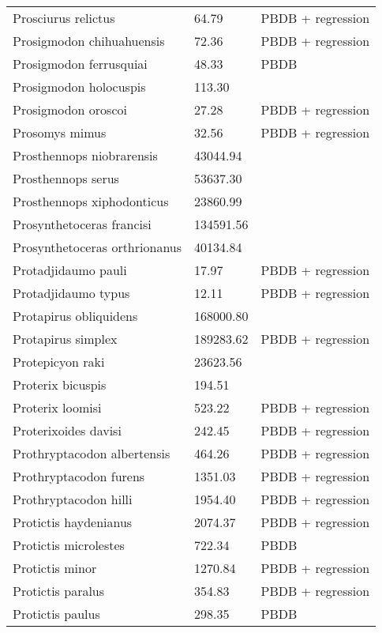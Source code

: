 \documentclass{article}
\begin{document}
\begin{center}
\begin{longtable}{p{} p{} p{}}
    Prosciurus relictus & 64.79 & PBDB + regression \\ 
    Prosigmodon chihuahuensis & 72.36 & PBDB + regression \\ 
    Prosigmodon ferrusquiai & 48.33 & PBDB \\ 
    Prosigmodon holocuspis & 113.30 & \cite{Tomiya2013} \\ 
    Prosigmodon oroscoi & 27.28 & PBDB + regression \\ 
    Prosomys mimus & 32.56 & PBDB + regression \\ 
    Prosthennops niobrarensis & 43044.94 & \cite{Tomiya2013} \\ 
    Prosthennops serus & 53637.30 & \cite{Tomiya2013} \\ 
    Prosthennops xiphodonticus & 23860.99 & \cite{Tomiya2013} \\ 
    Prosynthetoceras francisi & 134591.56 & \cite{Tomiya2013} \\ 
    Prosynthetoceras orthrionanus & 40134.84 & \cite{Tomiya2013} \\ 
    Protadjidaumo pauli & 17.97 & PBDB + regression \\ 
    Protadjidaumo typus & 12.11 & PBDB + regression \\ 
    Protapirus obliquidens & 168000.80 & \cite{Rose1982a} \\ 
    Protapirus simplex & 189283.62 & PBDB + regression \\ 
    Protepicyon raki & 23623.56 & \cite{Tomiya2013} \\ 
    Proterix bicuspis & 194.51 & \cite{Coombs1979} \\ 
    Proterix loomisi & 523.22 & PBDB + regression \\ 
    Proterixoides davisi & 242.45 & PBDB + regression \\ 
    Prothryptacodon albertensis & 464.26 & PBDB + regression \\ 
    Prothryptacodon furens & 1351.03 & PBDB + regression \\ 
    Prothryptacodon hilli & 1954.40 & PBDB + regression \\ 
    Protictis haydenianus & 2074.37 & PBDB + regression \\ 
    Protictis microlestes & 722.34 & PBDB \\ 
    Protictis minor & 1270.84 & PBDB + regression \\ 
    Protictis paralus & 354.83 & PBDB + regression \\ 
    Protictis paulus & 298.35 & PBDB \\ 

\end{longtable}
\end{center}
\end{document}
